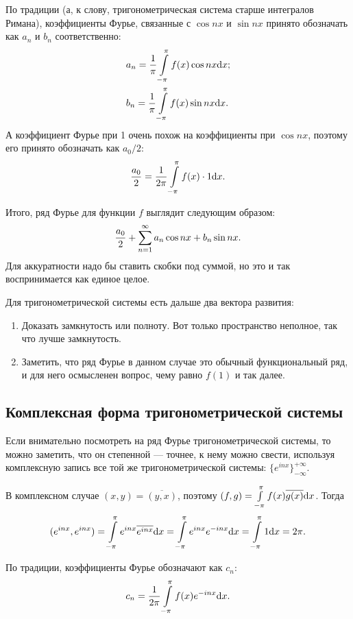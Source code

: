По традиции (а, к слову, тригонометрическая система старше интегралов Римана), коэффициенты Фурье, связанные с $\cos nx$ и $\sin nx$ принято обозначать как $a_n $ и $b_n$ соответственно:
\begin{align*}
&a_n = \frac{1}{\pi}  \int\limits_{-\pi}^{\pi} f(x) \cos nx \mathrm{d} x;\\
&b_n = \frac1\pi  \int\limits_{-\pi}^{\pi} f(x) \sin nx \mathrm{d} x.
\end{align*}
А коэффициент Фурье при 1 очень похож на коэффициенты при $\cos nx$, поэтому его принято обозначать как $a_0/2$:
$$
\frac{a_0}{2} = \frac{1}{2\pi} \int\limits_{-\pi}^{\pi} f(x) \cdot 1 \mathrm{d} x.
$$

Итого, ряд Фурье для функции $f$ выглядит следующим образом:
$$
\frac{a_0}{2} + \sum\limits_{n=1}^{\infty} a_n \cos nx + b_n \sin nx.
$$
Для аккуратности надо бы ставить скобки под суммой, но это и так воспринимается как единое целое.

Для тригонометрической системы есть дальше два вектора развития:
\begin{enumerate}
\item Доказать замкнутость или полноту. Вот только пространство неполное, так что лучше замкнутость.
\item Заметить, что ряд Фурье в данном случае это обычный функциональный ряд, и для него осмысленен вопрос, чему равно $f(1)$ и так далее.
\end{enumerate}

\subsection{Комплексная форма тригонометрической системы}
Если внимательно посмотреть на ряд Фурье тригонометрической системы, то можно заметить, что он степенной --- точнее, к нему можно свести, используя комплексную запись все той же тригонометрической системы: $\{ e^{inx} \}_{-\infty}^{+\infty}$.

В комплексном случае $(x, y) = \overline{(y, x)}$, поэтому $(f, g) =  \int\limits_{-\pi}^{\pi} f(x)\overline{g(x)} \mathrm{d} x$. Тогда
\begin{gather*}
(e^{inx}, e^{inx}) =  \int\limits_{-\pi}^{\pi} e^{inx} \overline{e^{inx}} \mathrm{d} x=  \int\limits_{-\pi}^{\pi} e^{inx} e^{-inx} \mathrm{d} x =  \int\limits_{-\pi}^{\pi} 1 \mathrm{d} x = 2 \pi.
\end{gather*}

По традиции, коэффициенты Фурье обозначают как $c_n$:
$$
c_n = \frac{1}{2\pi}  \int\limits_{-\pi}^{\pi} f(x) e^{-inx} \mathrm{d} x.
$$


